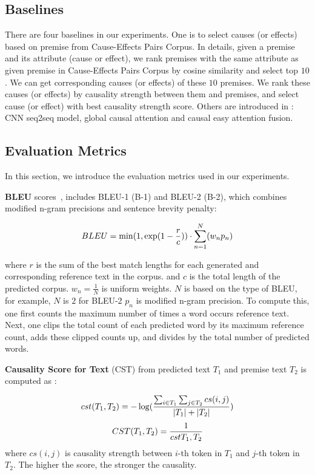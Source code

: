 \subsection{Baselines}
There are four baselines in our experiments.
One is to select causes (or effects) based on premise 
from Cause-Effects Pairs Corpus. 
In details, given a premise and its attribute (cause or effect), 
we rank premises with the same attribute as given premise
in Cause-Effects Pairs Corpus by cosine similarity 
and select top $10$. We can get corresponding causes (or effects)
of these $10$ premises. We rank these causes (or effects) by
causality strength between them and premises, and select cause (or effect)
with best causality strength score.
Others are introduced in :
CNN seq2seq model, global causal attention and
causal easy attention fusion. 



\subsection{Evaluation Metrics}
In this section, we introduce the evaluation metrics used in 
our experiments.

\textbf{BLEU} scores~\cite{PapineniRWZ02}, 
includes BLEU-1 (B-1) and BLEU-2 (B-2),
which combines modified n-gram precisions and sentence brevity penalty:

\begin{equation}
\small BLEU = \min(1,\exp(1-\frac{r}{c})) \cdot \sum_{n=1}^{N}(w_{n}p_{n})
\end{equation}

where $r$ is the sum of the best match lengths 
for each generated and corresponding reference text in the corpus.
and $c$ is the total length of the predicted corpus. 
$w_n=\frac{1}{N}$ is uniform weights. $N$ is based on the type of BLEU, 
for example, $N$ is $2$ for BLEU-2
$p_n$ is modified n-gram precision. To compute this, 
one first counts the maximum number of times a word occurs reference text. 
Next, one clips the total count of each predicted word by its maximum
reference count, adds these clipped counts up, and
divides by the total number of predicted words. 

\textbf{Causality Score for Text} (CST) from predicted text $T_1$
and premise text $T_2$ is computed as \cite{LuoSZHW16}:

\begin{equation}
\small cst(T_{1},T_{2}) = -\log(\frac{\sum_{i \in T_{1}}\sum_{j \in T_{2}}cs(i,j)}{\left| T_{1} \right| + \left| T_{2} \right|})
\end{equation}
\begin{equation}
\small CST(T_{1},T_{2}) = \frac{1}{cst{T_1,T_2}}
\end{equation}
where $cs(i,j)$ is causality strength 
between $i$-th token in $T_1$ and $j$-th token in $T_2$. 
The higher the score, the stronger the causality.

